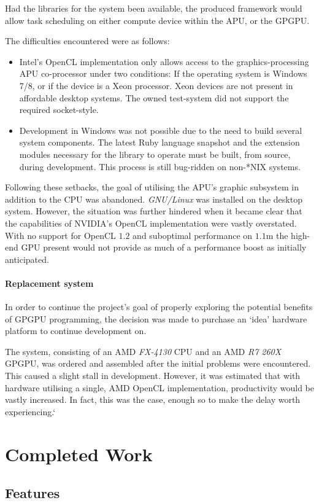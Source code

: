 Had the libraries for the system been available, the produced framework would allow task scheduling on either compute device within the \ac{APU}, or the \ac{GPGPU}.

The difficulties encountered were as follows:
\begin{itemize}
  \item Intel's \ac{OpenCL} implementation only allows access to the graphics-processing \ac{APU} co-processor under two conditions: If the operating system is Windows 7/8, or if the device is a Xeon processor. Xeon devices are not present in affordable desktop systems. The owned test-system did not support the required socket-style.

  \item Development in Windows was not possible due to the need to build several system components. The latest Ruby language snapshot and the extension modules necessary for the library to operate must be built, from source, during development. This process is still bug-ridden on non-*NIX systems.
\end{itemize}

Following these setbacks, the goal of utilising the \ac{APU}'s graphic subsystem in addition to the \ac{CPU} was abandoned. \emph{GNU/Linux} was installed on the desktop system. However, the situation was further hindered when it became clear that the capabilities of NVIDIA's \ac{OpenCL} implementation were vastly overstated. With no support for \ac{OpenCL} $1.2$ and suboptimal performance on $1.1$m the high-end \ac{GPU} present would not provide as much of a performance boost as initially anticipated.

\paragraph*{Replacement system}
In order to continue the project's goal of properly exploring the potential benefits of \ac{GPGPU} programming, the decision was made to purchase an `idea' hardware platform to continue development on.

The system, consisting of an \ac{AMD} \emph{FX-4130} CPU and an \ac{AMD} \emph{R7 260X} \ac{GPGPU}, was ordered and assembled after the initial problems were encountered. This caused a slight stall in development. However, it was estimated that with hardware utilising a single, \ac{AMD} \ac{OpenCL} implementation, productivity would be vastly increased. In fact, this was the case, enough so to make the delay worth experiencing.`

\section{Completed Work}
\subsection{Features}
